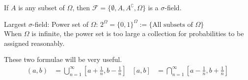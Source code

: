 \documentclass{huhtakm-template-book}
\begin{document}
\begin{eg}
	If $A$ is any subset of $\Omega$, then $\mathcal{F}=\{\emptyset,A,A^{\complement},\Omega\}$ is a $\sigma$-field.
\end{eg}
\begin{eg}
	Largest $\sigma$-field: Power set of $\Omega$: $2^{\Omega}=\{0,1\}^{\Omega}:=\{\text{All subsets of }\Omega\}$\\
	When $\Omega$ is infinite, the power set is too large a collection for probabilities to be assigned reasonably.
\end{eg}
\begin{rem}
	These two formulae will be very useful.
	\begin{align*}
		(a,b)&=\bigcup_{n=1}^{\infty}\left[a+\frac{1}{n},b-\frac{1}{n}\right] &            [a,b]&=\bigcap_{n=1}^{\infty}\left[a-\frac{1}{n},b+\frac{1}{n}\right]
	\end{align*}
\end{rem}
\end{document}
